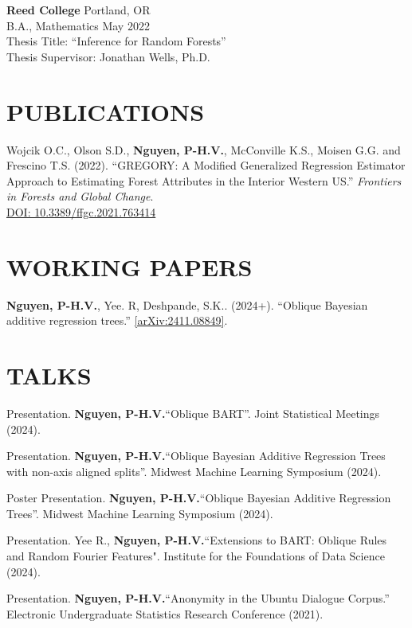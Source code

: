 \documentclass[margin]{res}
\def\pvn{\textbf{Nguyen, P-H.V.}}
\begin{document}
\begin{resume}
                {\bf Reed College} \hfill Portland, OR \\
                B.A., Mathematics \hfill May 2022 \\
                Thesis Title: ``Inference for Random Forests'' \\
                Thesis Supervisor: Jonathan Wells, Ph.D.
  
  


\section{PUBLICATIONS}

Wojcik O.C., Olson S.D., \pvn, McConville K.S., Moisen G.G. and Frescino T.S. (2022). ``GREGORY: A Modified Generalized Regression Estimator Approach to Estimating Forest Attributes in the Interior Western US.'' \textit{Frontiers in Forests and Global Change}. \\ \href{https://doi.org/10.3389/ffgc.2021.763414}{DOI: 10.3389/ffgc.2021.763414}

\section{WORKING PAPERS}

\pvn, Yee. R, Deshpande, S.K.. (2024+). ``Oblique Bayesian additive regression trees.'' \href{https://arxiv.org/abs/2411.08849}{[arXiv:2411.08849]}.

\section{TALKS}

Presentation. \pvn ``Oblique BART''. Joint Statistical Meetings (2024).

Presentation. \pvn ``Oblique Bayesian Additive Regression Trees with non-axis aligned splits''. Midwest Machine Learning Symposium (2024).

Poster Presentation. \pvn ``Oblique Bayesian Additive Regression Trees''. Midwest Machine Learning Symposium (2024).

Presentation. Yee R., \pvn  ``Extensions to BART: Oblique Rules and Random Fourier Features". Institute for the Foundations of Data Science (2024).

Presentation. \pvn ``Anonymity in the Ubuntu Dialogue Corpus.” Electronic Undergraduate Statistics Research Conference (2021).


\end{resume}
\end{document}
